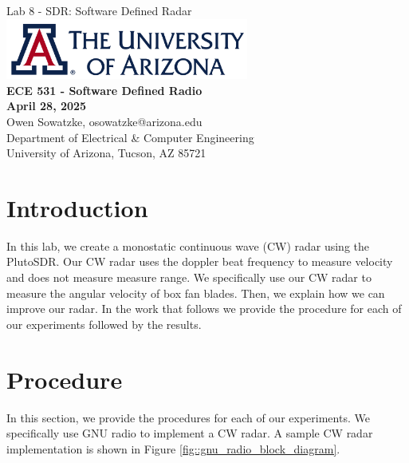 \documentclass{article}
\begin{document}
\begin{titlepage}
	\centering
	{\huge Lab 8 - SDR: Software Defined Radar}\\[0.25 in]
	\includegraphics[width=0.6\textwidth]{ua_logo.png}\\[0.25 in]
	{\large \textbf{ECE 531 - Software Defined Radio\\[0.25 in]
	April 28, 2025\\[0.25 in]}}
	{\large Owen Sowatzke, osowatzke@arizona.edu\\[0.05 in]
	Department of Electrical \& Computer Engineering\\[0.05 in]
	University of Arizona, Tucson, AZ 85721\\[0.5 in]}
	\hypersetup{linkcolor=navy-blue}
	\noindent\hrulefill
	\tableofcontents
	\noindent\hrulefill
\end{titlepage}


\section{Introduction}

In this lab, we create a monostatic continuous wave (CW) radar using the PlutoSDR. Our CW radar uses the doppler beat frequency to measure velocity and does not measure measure range. We specifically use our CW radar to measure the angular velocity of box fan blades. Then, we explain how we can improve our radar. In the work that follows we provide the procedure for each of our experiments followed by the results. 

\section{Procedure}

In this section, we provide the procedures for each of our experiments. We specifically use GNU radio to implement a CW radar. A sample CW radar implementation is shown in Figure \ref{fig::gnu_radio_block_diagram}.
\end{document}
